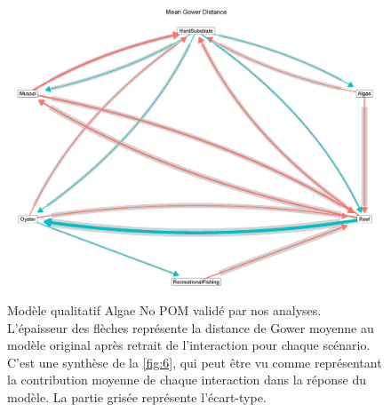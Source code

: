 \documentclass[12pt]{report}
\begin{document}
\begin{figure}
    \centering
    \includegraphics[height = \textwidth, width = .9\textheight,angle = 90]{mean_gowdis_sd.jpg}
    \caption[]{Modèle qualitatif Algae No POM validé par nos analyses. L'épaisseur des flèches représente la distance de Gower moyenne au modèle original après retrait de l'interaction pour chaque scénario. C'est une synthèse de la \autoref{fig:6}, qui peut être vu comme représentant la contribution moyenne de chaque interaction dans la réponse du modèle. La partie grisée représente l'écart-type.}
    \label{fig:5anx}
\end{figure}
\end{document}
